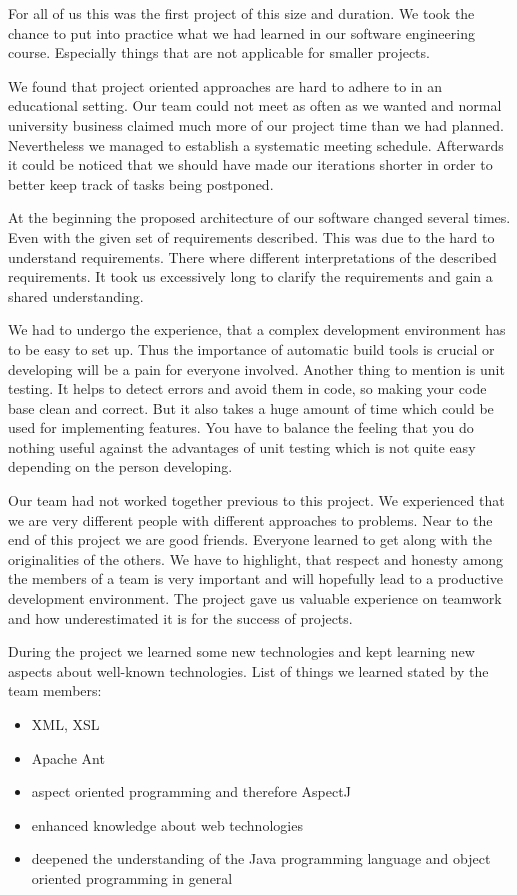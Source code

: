 For all of us this was the first project of this size and duration. We took the chance to put into practice what we had learned in our software engineering course. Especially things that are not applicable for smaller projects.

We found that project oriented approaches are hard to adhere to in an educational setting. Our team could not meet as often as we wanted and normal university business claimed much more of our project time than we had planned. Nevertheless we managed to establish a systematic meeting schedule. Afterwards it could be noticed that we should have made our iterations shorter in order to better keep track of tasks being postponed.

At the beginning the proposed architecture of our software changed several times. Even with the given set of requirements described. This was due to the hard to understand requirements. There where different interpretations of the described requirements. It took us excessively long to clarify the requirements and gain a shared understanding.

We had to undergo the experience, that a complex development environment has to be easy to set up. Thus the importance of automatic build tools is crucial or developing will be a pain for everyone involved.
Another thing to mention is unit testing. It helps to detect errors and avoid them in code, so making your code base clean and correct. But it also takes a huge amount of time which could be used for implementing features. You have to balance the feeling that you do nothing useful against the advantages of unit testing which is not quite easy depending on the person developing.

Our team had not worked together previous to this project. We experienced that we are very different people with different approaches to problems. Near to the end of this project we are good friends. Everyone learned to get along with the originalities of the others. We have to highlight, that respect and honesty among the members of a team is very important and will hopefully lead to a productive development environment. The project gave us valuable experience on teamwork and how underestimated it is for the success of projects.

During  the  project  we learned  some  new  technologies and kept learning new aspects about well-known technologies.
List of things we learned stated by the team members:
\begin{itemize}
	\item XML, XSL
	\item Apache Ant
	\item aspect oriented programming and therefore AspectJ
	\item enhanced knowledge about web technologies
	\item deepened the understanding of the Java programming language and object oriented programming in general
\end{itemize}
